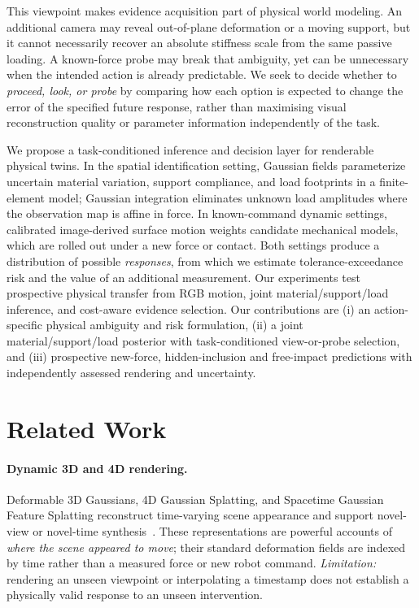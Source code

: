 \documentclass[10pt,twocolumn,letterpaper]{article}
\begin{document}
This viewpoint makes evidence acquisition part of physical world modeling. An additional camera may reveal out-of-plane deformation or a moving support, but it cannot necessarily recover an absolute stiffness scale from the same passive loading. A known-force probe may break that ambiguity, yet can be unnecessary when the intended action is already predictable. We seek to decide whether to \emph{proceed, look, or probe} by comparing how each option is expected to change the error of the specified future response, rather than maximising visual reconstruction quality or parameter information independently of the task.

We propose a task-conditioned inference and decision layer for renderable physical twins. In the spatial identification setting, Gaussian fields parameterize uncertain material variation, support compliance, and load footprints in a finite-element model; Gaussian integration eliminates unknown load amplitudes where the observation map is affine in force. In known-command dynamic settings, calibrated image-derived surface motion weights candidate mechanical models, which are rolled out under a new force or contact. Both settings produce a distribution of possible \emph{responses}, from which we estimate tolerance-exceedance risk and the value of an additional measurement. Our experiments test prospective physical transfer from RGB motion, joint material/support/load inference, and cost-aware evidence selection. Our contributions are (i) an action-specific physical ambiguity and risk formulation, (ii) a joint material/support/load posterior with task-conditioned view-or-probe selection, and (iii) prospective new-force, hidden-inclusion and free-impact predictions with independently assessed rendering and uncertainty.

\section{Related Work}
\paragraph{Dynamic 3D and 4D rendering.}
Deformable 3D Gaussians, 4D Gaussian Splatting, and Spacetime Gaussian Feature Splatting reconstruct time-varying scene appearance and support novel-view or novel-time synthesis~\cite{yang2024deformablegs,wu2024fourDgs,li2024spacetimegs}. These representations are powerful accounts of \emph{where the scene appeared to move}; their standard deformation fields are indexed by time rather than a measured force or new robot command. \emph{Limitation:} rendering an unseen viewpoint or interpolating a timestamp does not establish a physically valid response to an unseen intervention.
\end{document}
